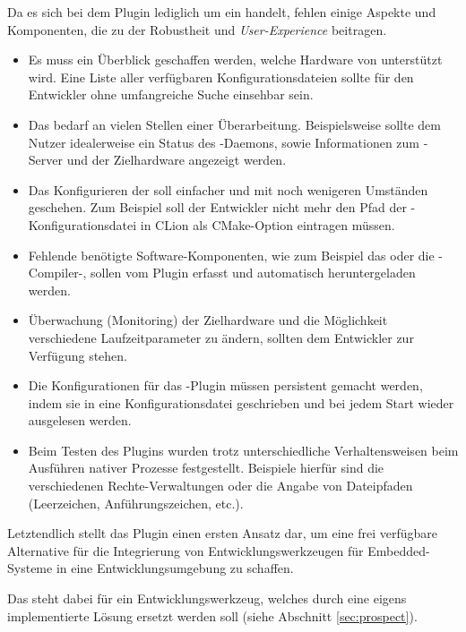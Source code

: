         Da es sich bei dem Plugin lediglich um ein  handelt, fehlen einige Aspekte und
        Komponenten, die zu der Robustheit und \textit{User-Experience} beitragen.
        \begin{itemize}
            \item Es muss ein Überblick geschaffen werden, welche Hardware von  unterstützt wird. Eine Liste
            aller verfügbaren Konfigurationsdateien sollte für den Entwickler ohne umfangreiche Suche einsehbar sein.
            \item Das  bedarf an vielen Stellen einer Überarbeitung. Beispielsweise sollte dem Nutzer idealerweise
            ein Status des -Daemons, sowie Informationen zum -Server und der Zielhardware angezeigt werden.
            \item Das Konfigurieren der  soll einfacher und mit noch wenigeren Umständen geschehen.
            Zum Beispiel soll der Entwickler nicht mehr den Pfad der -Konfigurationsdatei in CLion
            als CMake-Option eintragen müssen.
            \item Fehlende benötigte Software-Komponenten, wie zum Beispiel das  oder die
            -Compiler-, sollen vom Plugin erfasst und automatisch heruntergeladen
            werden.
            \item Überwachung (Monitoring) der Zielhardware und die Möglichkeit verschiedene Laufzeitparameter zu
            ändern, sollten dem Entwickler zur Verfügung stehen.
            \item Die Konfigurationen für das -Plugin müssen persistent gemacht werden, indem sie in eine
            Konfigurationsdatei geschrieben und bei jedem Start wieder ausgelesen werden.
            \item Beim Testen des Plugins wurden trotz  unterschiedliche Verhaltensweisen beim Ausführen nativer
            Prozesse festgestellt. Beispiele hierfür sind die verschiedenen Rechte-Verwaltungen oder die Angabe von
            Dateipfaden (Leerzeichen, Anführungszeichen, etc.).
        \end{itemize}

        Letztendlich stellt das Plugin einen ersten Ansatz dar, um eine frei verfügbare Alternative für die Integrierung
        von Entwicklungswerkzeugen für Embedded-Systeme in eine Entwicklungsumgebung zu schaffen.

        Das  steht dabei für ein Entwicklungswerkzeug, welches durch eine eigens implementierte
        Lösung ersetzt werden soll (siehe Abschnitt \ref{sec:prospect}).